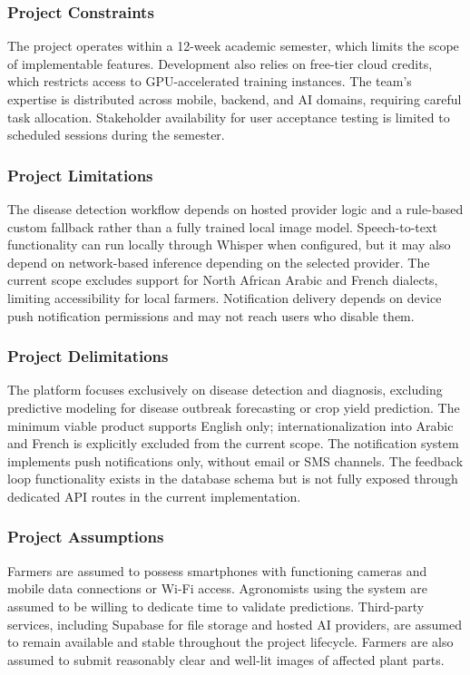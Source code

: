 \documentclass[12pt]{article}
\begin{document}
\subsubsection{Project Constraints}
The project operates within a 12-week academic semester, which limits the scope of implementable features. Development also relies on free-tier cloud credits, which restricts access to GPU-accelerated training instances. The team’s expertise is distributed across mobile, backend, and AI domains, requiring careful task allocation. Stakeholder availability for user acceptance testing is limited to scheduled sessions during the semester.

\subsubsection{Project Limitations}
The disease detection workflow depends on hosted provider logic and a rule-based custom fallback rather than a fully trained local image model. Speech-to-text functionality can run locally through Whisper when configured, but it may also depend on network-based inference depending on the selected provider. The current scope excludes support for North African Arabic and French dialects, limiting accessibility for local farmers. Notification delivery depends on device push notification permissions and may not reach users who disable them.

\subsubsection{Project Delimitations}
The platform focuses exclusively on disease detection and diagnosis, excluding predictive modeling for disease outbreak forecasting or crop yield prediction. The minimum viable product supports English only; internationalization into Arabic and French is explicitly excluded from the current scope. The notification system implements push notifications only, without email or SMS channels. The feedback loop functionality exists in the database schema but is not fully exposed through dedicated API routes in the current implementation.

\subsubsection{Project Assumptions}
Farmers are assumed to possess smartphones with functioning cameras and mobile data connections or Wi-Fi access. Agronomists using the system are assumed to be willing to dedicate time to validate predictions. Third-party services, including Supabase for file storage and hosted AI providers, are assumed to remain available and stable throughout the project lifecycle. Farmers are also assumed to submit reasonably clear and well-lit images of affected plant parts.
\end{document}
